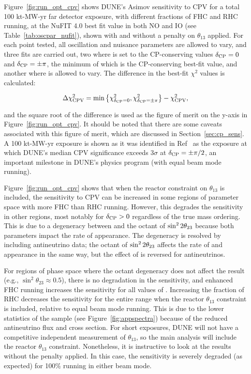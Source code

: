 Figure~\ref{fig:run_opt_cpv} shows DUNE's Asimov sensitivity to CPV for a total 100 kt-MW-yr far detector exposure, with different fractions of FHC and RHC running, at the NuFIT 4.0 best fit value in both NO and IO (see Table~\ref{tab:oscpar_nufit}), shown with and without a penalty on $\theta_{13}$ applied. For each point tested, all oscillation and nuisance parameters are allowed to vary, and three fits are carried out, two where \deltacp is set to the CP-conserving values $\delta_{\rm CP} = 0$ and $\delta_{\rm CP} = \pm\pi$, the minimum of which is the CP-conserving best-fit value, and another where \deltacp is allowed to vary. The difference in the best-fit $\chi^{2}$ values is calculated:
\begin{linenomath*}
  \begin{equation}
    \Delta\chi^{2}_{\mathrm{CPV}} = \min\left\{\chi^{2}_{\delta_{\rm CP} = 0},\chi^{2}_{\delta_{\rm CP} = \pm\pi}\right\} - \chi^{2}_{\mathrm{CPV}},
    \label{eq:cpv_chi2}
  \end{equation}
\end{linenomath*}
\noindent and the square root of the difference is  used as the figure of merit on the y-axis in Figure~\ref{fig:run_opt_cpv}. It should be noted that there are some caveats associated with this figure of merit, which are discussed in Section~\ref{sec:cp_sens}. A 100 kt-MW-yr exposure is shown as it was identified in Ref~\cite{Abi:2020qib} as the exposure at which DUNE's median CPV significance exceeds 3$\sigma$ at $\delta_{\rm CP} = \pm\pi/2$, an important milestone in DUNE's physics program (with equal beam mode running). 

Figure~\ref{fig:run_opt_cpv} shows that when the reactor constraint on $\theta_{13}$ is included, the sensitivity to CPV can be increased in some regions of \deltacp parameter space with more FHC than RHC running. However, this degrades the sensitivity in other regions, most notably for $\delta_{\rm CP} > 0$ regardless of the true mass ordering. This is due to a degeneracy between \deltacp and the octant of $\sin^22\theta_{23}$ because both parameters impact the rate of \nue appearance. The degeneracy is resolved by including antineutrino data; the octant of $\sin^22\theta_{23}$ affects the rate of \nue and \anue appearance in the same way, but the effect of \deltacp is reversed for antineutrinos.

For regions of phase space where the octant degeneracy does not affect the result (e.g., $\sin^{2}\theta_{23} \approx 0.5$), there is no degradation in the sensitivity, and enhanced FHC running increases the sensitivity for all values of \deltacp. Increasing the fraction of RHC decreases the sensitivity for the entire \deltacp range when the reactor $\theta_{13}$ constraint is included, relative to equal beam mode running. This is due to the lower statistics of the \anue sample (see Figure~\ref{fig:appspectra}) because of the reduced antineutrino flux and cross section. For short exposures, DUNE will not have a competitive independent measurement of $\theta_{13}$, so the main analysis will include the reactor $\theta_{13}$ constraint. Nonetheless, it is instructive to look at the results without the penalty applied. In this case, the sensitivity is severely degraded (as expected) for 100\% running in either beam mode.



